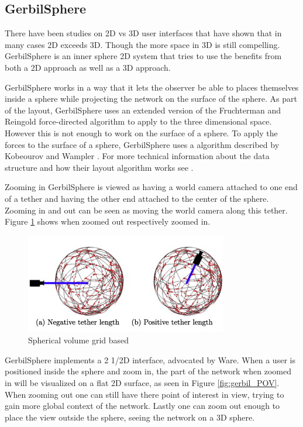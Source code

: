 \documentclass[a4paper,11pt]{kth-mag}
\begin{document}
\subsection{GerbilSphere}
\label{Gerbil:chap2}
There have been studies on 2D vs 3D user interfaces that have shown that in many cases 2D exceeds 3D. Though the more space in 3D is still compelling. GerbilSphere is an inner sphere 2D system that tries to 
use the benefits from both a 2D approach as well as a 3D approach.

GerbilSphere works in a way that it lets the observer be able to places themselves inside a sphere while projecting the network on the surface of the sphere. As part of the layout, GerbilSphere uses an extended version of the
 Fruchterman and Reingold force-directed algorithm to apply to the three dimensional space. However this is not enough to work on the surface of a sphere. To apply the forces to the surface of a sphere, GerbilSphere uses a 
 algorithm described by Kobeourov and Wampler \cite{kobourov}. For more technical information about the data structure and how their layout algorithm works see \cite{Shelley20121016}.

Zooming in GerbilSphere is viewed as having a world camera attached to one end of a tether and having the other end attached to the center of the sphere. Zooming in and out can be seen as moving the world camera along this 
tether. Figure \ref{fig:gerbil_zoom} shows when zoomed out respectively zoomed in.
\begin{figure}[!htbp]
	\centering
	\includegraphics{GerbilZoomTether}
	\caption{Spherical volume grid based}
	\label{fig:gerbil_zoom}
\end{figure}

GerbilSphere implements a 2 1/2D interface, advocated by Ware\cite{Ware}. When a user is positioned inside the sphere and zoom in, the part of the network when zoomed in will be visualized on a flat 2D surface, as seen in Figure
\ref{fig:gerbil_POV}. When zooming out one can still have there point of interest in view, trying to gain more global context of the network. Lastly one can zoom
 out enough to place the view outside the sphere, seeing the network on a 3D sphere.
 
\end{document}
